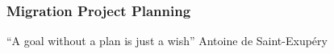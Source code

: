\documentclass{beamer}
\begin{document}
{
  \begin{frame}[plain]

    \frametitle{Migration Project Planning}

      \begin{flushright}
        \begin{LARGE}
          “A goal without a plan is just a wish”
          \newline
          \newline
          Antoine de Saint-Exupéry
        \end{LARGE}
      \end{flushright}
  \end{frame}
}
\end{document}

